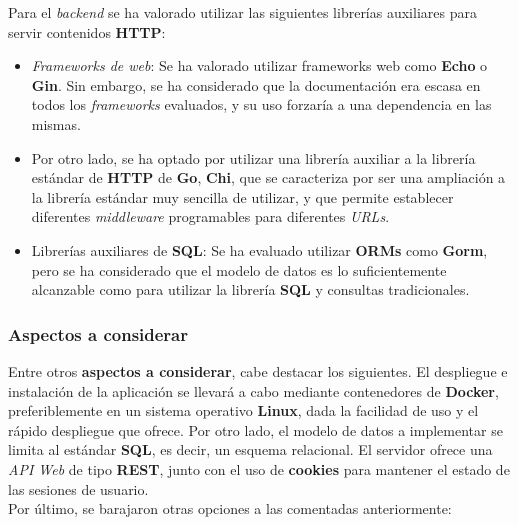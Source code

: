 \documentclass[11pt, a4paper, titlepage]{article}
\begin{document}
Para el \textit{backend} se ha valorado utilizar las siguientes librerías auxiliares para servir contenidos \textbf{HTTP}:


\begin{itemize}
    \item \textit{Frameworks de web}: Se ha valorado utilizar frameworks web como \textbf{Echo} o \textbf{Gin}. Sin embargo, se ha considerado que  la documentación era escasa en todos los \textit{frameworks} evaluados, y su uso forzaría a una dependencia en las mismas. 
    
    \item Por otro lado, se ha optado por utilizar una librería auxiliar a la librería estándar de \textbf{HTTP} de \textbf{Go}, \textbf{Chi}, que se caracteriza por ser una ampliación a la librería estándar muy sencilla de utilizar, y que permite establecer diferentes \textit{middleware} programables para diferentes \textit{URLs}.
    
    \item Librerías auxiliares de \textbf{SQL}: Se ha evaluado utilizar \textbf{ORMs} como \textbf{Gorm}, pero se ha considerado que el modelo de datos es lo suficientemente alcanzable como para utilizar la librería \textbf{SQL} y consultas tradicionales.
\end{itemize}

\subsubsection{Aspectos a considerar}

Entre otros \textbf{aspectos a considerar}, cabe destacar los siguientes. El despliegue e instalación de la aplicación se llevará a cabo mediante contenedores de \textbf{Docker}, preferiblemente en un sistema operativo \textbf{Linux}, dada la facilidad de uso y el rápido despliegue que ofrece. Por otro lado, el modelo de datos a implementar se limita al estándar \textbf{SQL}, es decir, un esquema relacional. El servidor ofrece una \textit{API Web} de tipo \textbf{REST}, junto con el uso de \textbf{cookies} para mantener el estado de las sesiones de usuario. \\ 

Por último, se barajaron otras opciones a las comentadas anteriormente:
\end{document}
